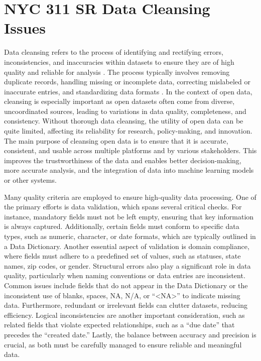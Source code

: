 \documentclass[linenumber]{jdsart}
\begin{document}
\section{NYC 311 SR Data Cleansing Issues} 
\label{sec:issues}

Data cleansing refers to the process of identifying and rectifying
errors, inconsistencies, and inaccuracies within datasets to ensure
they are of high quality and reliable for analysis
\citep{maletic2005data, hosseinzadeh2023data}. The process
typically involves removing duplicate records, handling missing or
incomplete data, correcting mislabeled or inaccurate entries, and
standardizing data formats \citep[e.g.,][]{cody2017cody,
  van2018statistical}. In the context of open data, cleansing is
especially important as open datasets often come from diverse,
uncoordinated sources, leading to variations in data quality,
completeness, and consistency. Without thorough data cleansing, the utility
of open data can be quite limited, affecting its reliability for
research, policy-making, and innovation. The main purpose of cleansing
open data is to ensure that it is accurate, consistent, and usable
across multiple platforms and by various stakeholders. This improves
the trustworthiness of the data and enables better decision-making,
more accurate analysis, and the integration of data into machine
learning models or other systems.


Many quality criteria are employed to ensure high-quality data 
processing. One of the primary efforts is data validation, which spans 
several critical checks. For instance, mandatory fields must not be 
left empty, ensuring that key information is always captured. 
Additionally, certain fields must conform to specific data types, 
such as numeric, character, or date formats, which are typically 
outlined in a Data Dictionary. Another essential aspect of validation 
is domain compliance, where fields must adhere to a predefined set of 
values, such as statuses, state names, zip codes, or gender. Structural 
errors also play a significant role in data quality, particularly when 
naming conventions or data entries are inconsistent. Common issues 
include fields that do not appear in the Data Dictionary or the 
inconsistent use of blanks, spaces, NA, N/A, or ``<NA>'' to indicate 
missing data. Furthermore, redundant or irrelevant fields can clutter 
datasets, reducing efficiency. Logical inconsistencies are another 
important consideration, such as related fields that violate expected 
relationships, such as a ``due date'' that precedes the ``created date.'' 
Lastly, the balance between accuracy and precision is crucial, as both 
must be carefully managed to ensure reliable and meaningful data.
\end{document}
